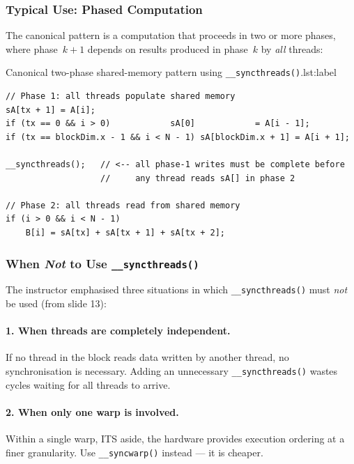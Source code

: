 \subsubsection{Typical Use: Phased Computation}

The canonical pattern is a computation that proceeds in two or more phases,
where phase~$k+1$ depends on results produced in phase~$k$ by \emph{all}
threads:

\begin{ppprogram}{Canonical two-phase shared-memory pattern using
\texttt{\_\_syncthreads()}.}{lst:label}
\begin{lstlisting}
// Phase 1: all threads populate shared memory
sA[tx + 1] = A[i];
if (tx == 0 && i > 0)            sA[0]            = A[i - 1];
if (tx == blockDim.x - 1 && i < N - 1) sA[blockDim.x + 1] = A[i + 1];

__syncthreads();   // <-- all phase-1 writes must be complete before
                   //     any thread reads sA[] in phase 2

// Phase 2: all threads read from shared memory
if (i > 0 && i < N - 1)
    B[i] = sA[tx] + sA[tx + 1] + sA[tx + 2];
\end{lstlisting}
\end{ppprogram}

\subsubsection{When \emph{Not} to Use \texttt{\_\_syncthreads()}}

The instructor emphasised three situations in which \texttt{\_\_syncthreads()}
must \emph{not} be used (from slide 13):

\paragraph{1. When threads are completely independent.}
If no thread in the block reads data written by another thread, no
synchronisation is necessary. Adding an unnecessary \texttt{\_\_syncthreads()}
wastes cycles waiting for all threads to arrive.

\paragraph{2. When only one warp is involved.}
Within a single warp, ITS aside, the hardware provides execution ordering at a
finer granularity. Use \texttt{\_\_syncwarp()} instead --- it is cheaper.

